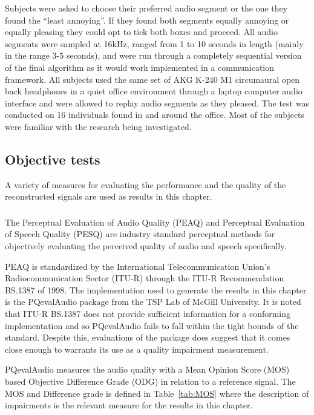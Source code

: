 Subjects were asked to choose their preferred audio segment or the one they found the ``least annoying''. If they found both segments equally annoying or equally pleasing they could opt to tick both boxes and proceed. All audio segments were sampled at 16kHz, ranged from 1 to 10 seconds in length (mainly in the range 3-5 seconds), and were run through a completely sequential version of the final algorithm as it would work implemented in a communication framework. All subjects used the same set of AKG K-240 M1 circumaural open back headphones in a quiet office environment through a laptop computer audio interface and were allowed to replay audio segments as they pleased. The test was conducted on 16 individuals found in and around the office. Most of the subjects were familiar with the research being investigated.

\subsection{Objective tests}
A variety of measures for evaluating the performance and the quality of the reconstructed signals are used as results in this chapter. 
\subsubsection{}
The Perceptual Evaluation of Audio Quality (PEAQ) and Perceptual Evaluation of Speech Quality (PESQ) are industry standard perceptual methods for objectively evaluating the perceived quality of audio and speech specifically.

PEAQ is standardized by the International Telecommunication Union's Radiocommunication Sector (ITU-R) through the ITU-R Recommendation BS.1387\cite{BS-1387-1998} of 1998. The implementation used to generate the results in this chapter is the PQevalAudio package from the TSP Lab of McGill University\cite{Kabal2003}. It is noted that ITU-R BS.1387 does not provide sufficient information for a conforming implementation\cite{Campeanu2005} and so PQevalAudio fails to fall within the tight bounds of the standard. Despite this, evaluations of the package does suggest that it comes close enough to warrants its use as a quality impairment measurement\cite{Kabal2003}.

PQevalAudio measures the audio quality with a Mean Opinion Score (MOS) based Objective Difference Grade (ODG) in relation to a reference signal. The MOS\cite{P-800-1996} and Difference grade\cite{Kabal2003} is defined in Table~\ref{tab:MOS} where the description of impairments is the relevant measure for the results in this chapter.

